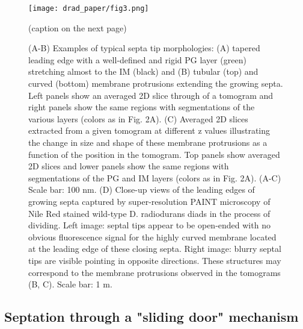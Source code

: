 \begin{figure}[ht]
    \centering
    \texttt{[image: drad\_paper/fig3.png]}
    \caption[Close-up view of the septal tips]{(caption on the next page)}
    \label{drad_fig3}
\end{figure}
\begin{figure}[ht]
    \ContinuedFloat
    \caption{(A-B) Examples of typical septa tip morphologies: (A) tapered leading edge with a well-defined and rigid PG layer (green) stretching almost to the IM (black) and (B) tubular (top) and curved (bottom) membrane protrusions extending the growing septa. Left panels show an averaged 2D slice through of a tomogram and right panels show the same regions with segmentations of the various layers (colors as in Fig. 2A). (C) Averaged 2D slices extracted from a given tomogram at different z values illustrating the change in size and shape of these membrane protrusions as a function of the position in the tomogram. Top panels show averaged 2D slices and lower panels show the same regions with segmentations of the PG and IM layers (colors as in Fig. 2A). (A-C) Scale bar: 100 nm. (D) Close-up views of the leading edges of growing septa captured by super-resolution PAINT microscopy of Nile Red stained wild-type D. radiodurans diads in the process of dividing. Left image: septal tips appear to be open-ended with no obvious fluorescence signal for the highly curved membrane located at the leading edge of these closing septa. Right image: blurry septal tips are visible pointing in opposite directions. These structures may correspond to the membrane protrusions observed in the tomograms (B, C). Scale bar: 1 \mu{}m.}
\end{figure}

\FloatBarrier

\subsection{Septation through a "sliding door" mechanism}

